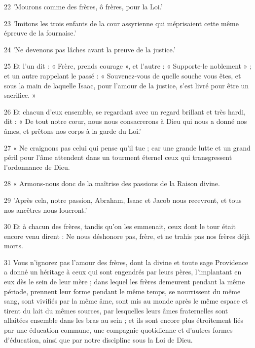 \par 22 'Mourons comme des frères, ô frères, pour la Loi.'

\par 23 'Imitons les trois enfants de la cour assyrienne qui méprisaient cette même épreuve de la fournaise.'

\par 24 'Ne devenons pas lâches avant la preuve de la justice.'

\par 25 Et l'un dit : « Frère, prends courage », et l'autre : « Supporte-le noblement » ; et un autre rappelant le passé : « Souvenez-vous de quelle souche vous êtes, et sous la main de laquelle Isaac, pour l'amour de la justice, s'est livré pour être un sacrifice. »

\par 26 Et chacun d'eux ensemble, se regardant avec un regard brillant et très hardi, dit : « De tout notre cœur, nous nous consacrerons à Dieu qui nous a donné nos âmes, et prêtons nos corps à la garde du Loi.'

\par 27 « Ne craignons pas celui qui pense qu'il tue ; car une grande lutte et un grand péril pour l'âme attendent dans un tourment éternel ceux qui transgressent l'ordonnance de Dieu.

\par 28 « Armons-nous donc de la maîtrise des passions de la Raison divine.

\par 29 'Après cela, notre passion, Abraham, Isaac et Jacob nous recevront, et tous nos ancêtres nous loueront.'

\par 30 Et à chacun des frères, tandis qu'on les emmenait, ceux dont le tour était encore venu dirent : Ne nous déshonore pas, frère, et ne trahis pas nos frères déjà morts.

\par 31 Vous n'ignorez pas l'amour des frères, dont la divine et toute sage Providence a donné un héritage à ceux qui sont engendrés par leurs pères, l'implantant en eux dès le sein de leur mère ; dans lequel les frères demeurent pendant la même période, prennent leur forme pendant le même temps, se nourrissent du même sang, sont vivifiés par la même âme, sont mis au monde après le même espace et tirent du lait du mêmes sources, par lesquelles leurs âmes fraternelles sont allaitées ensemble dans les bras au sein ; et ils sont encore plus étroitement liés par une éducation commune, une compagnie quotidienne et d'autres formes d'éducation, ainsi que par notre discipline sous la Loi de Dieu.

